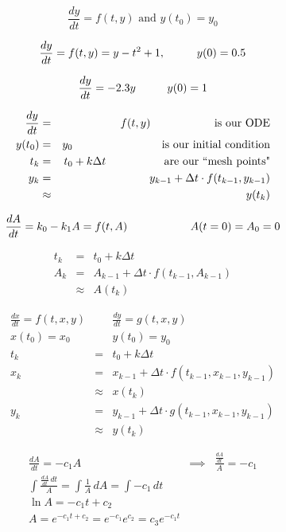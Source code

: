 \documentclass{article}
\begin{document}
\large


\[ \frac{dy}{dt} = f(t,y) \textrm{ and } y(t_0) = y_0 \]

\[ \frac{dy}{dt} = f(t,y) = y - t^2 + 1, \hspace{1 cm} y(0)=0.5 \]

\[ \frac{dy}{dt} = -2.3y \hspace{1 cm} y(0) = 1 \]

\begin{eqnarray*}
\frac{dy}{dt} & = & f(t,y) \hspace{1.9 cm} \textrm{ is our ODE}\\
y(t_0) & = & y_0  \hspace{2.7 cm} \textrm{ is our initial condition}\\
t_k & = & t_0 + k \Delta t  \hspace{1.72 cm} \textrm{ are our ``mesh points"}\\
y_k & =& y_{k-1} + \Delta t \cdot f(t_{k-1},y_{k-1})\\
& \approx & y(t_k)
\end{eqnarray*}

\[ \frac{dA}{dt} = k_0 - k_1 A = f(t, A) \hspace{2 cm} A(t=0) = A_0 = 0 \]

\begin{eqnarray*}
 t_k & = & t_0 + k \Delta t\\
A_k & =& A_{k-1} + \Delta t \cdot f(t_{k-1},A_{k-1})\\
& \approx & A(t_k)
\end{eqnarray*}



\begin{eqnarray*}
\frac{dx}{dt} = f(t, x, y) & & \frac{dy}{dt} = g(t, x, y)\\
x(t_0) = x_0 & & y(t_0) =  y_0 \\
t_k & = & t_0 + k \Delta t\\
x_k & =& x_{k-1} + \Delta t \cdot f(t_{k-1},x_{k-1},y_{k-1})\\
& \approx & x(t_k)\\
y_k & =& y_{k-1} + \Delta t \cdot g(t_{k-1},x_{k-1}, y_{k-1})\\
& \approx & y(t_k)
\end{eqnarray*}

\begin{eqnarray*}
\frac{d A}{dt} = - c_1 A & \implies & \frac{\frac{d A}{dt} }{A} = - c_1\\
\int \frac{\frac{d A}{dt} \,  dt}{A} = \int \frac{1}{A} \, dA = \int - c_1 \, dt\\
\ln A = -c_1 t + c_2\\
A = e^{-c_1 t + c_2} = e^{-c_1}e^{c_2} = c_3 e^{-c_1 t}
\end{eqnarray*}
\end{document}
